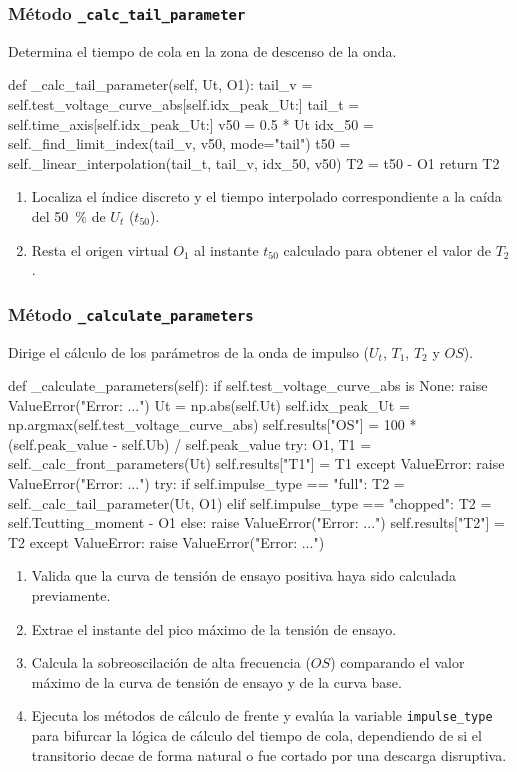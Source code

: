 \subsubsection{Método \texttt{\_calc\_tail\_parameter}}
Determina el tiempo de cola en la zona de descenso de la onda.

\begin{python}
def _calc_tail_parameter(self, Ut, O1):
    tail_v = self.test_voltage_curve_abs[self.idx_peak_Ut:]
    tail_t = self.time_axis[self.idx_peak_Ut:]
    v50 = 0.5 * Ut
    idx_50 = self._find_limit_index(tail_v, v50, mode="tail")
    t50 = self._linear_interpolation(tail_t, tail_v, idx_50, v50)
    T2 = t50 - O1
    return T2
\end{python}

\begin{enumerate}
    \item Localiza el índice discreto y el tiempo interpolado correspondiente a la caída del \SI{50}{\percent} de $U_t$ ($t_{50}$).
    \item Resta el origen virtual $O_1$ al instante $t_{50}$ calculado para obtener el valor de $T_2$.
\end{enumerate}

\subsubsection{Método \texttt{\_calculate\_parameters}}
Dirige el cálculo de los parámetros de la onda de impulso ($U_t$, $T_1$, $T_2$ y $OS$).

\begin{python}
def _calculate_parameters(self):
    if self.test_voltage_curve_abs is None:
        raise ValueError("Error: ...")
    Ut = np.abs(self.Ut)
    self.idx_peak_Ut = np.argmax(self.test_voltage_curve_abs)
    self.results["OS"] = 100 * (self.peak_value - self.Ub) / self.peak_value
    try:
        O1, T1 = self._calc_front_parameters(Ut)
        self.results["T1"] = T1
    except ValueError:
        raise ValueError("Error: ...")
    try:
        if self.impulse_type == "full":
            T2 = self._calc_tail_parameter(Ut, O1)
        elif self.impulse_type == "chopped":
            T2 = self.Tcutting_moment - O1
        else:
            raise ValueError("Error: ...")
        self.results["T2"] = T2
    except ValueError:
        raise ValueError("Error: ...")
\end{python}

\begin{enumerate}
    \item Valida que la curva de tensión de ensayo positiva haya sido calculada previamente.
    \item Extrae el instante del pico máximo de la tensión de ensayo.
    \item Calcula la sobreoscilación de alta frecuencia ($OS$) comparando el valor máximo de la curva de tensión de ensayo y de la curva base.
    \item Ejecuta los métodos de cálculo de frente y evalúa la variable \texttt{impulse\_type} para bifurcar la lógica de cálculo del tiempo de cola, dependiendo de si el transitorio decae de forma natural o fue cortado por una descarga disruptiva.
\end{enumerate}

